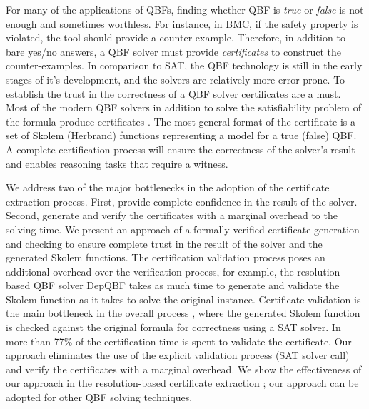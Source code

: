 \documentclass[runningheads]{llncs}
\newcommand{\0}{0}
\newcommand{\1}{1}
\begin{document}
For many of the applications of QBFs, finding whether QBF is \textit{true} or \textit{false} is not enough and sometimes worthless. For instance, in BMC, if the safety property is violated, the tool should provide a counter-example. Therefore, in addition to bare yes/no answers, a QBF solver must provide \textit{certificates} to construct the counter-examples. In comparison to SAT, the QBF technology is still in the early stages of it's development, and the solvers are relatively more error-prone. To establish the trust in the correctness of a QBF solver certificates are a must. Most of the modern QBF solvers in addition to solve the satisfiability problem of the formula produce certificates \cite{Balabanov2015, RabeS16, BalabanovJ12, Benedetti05, NarizzanoPPT09, NiemetzPLSB12, JussilaBSKW07, GoultiaevaGB11, Van2013, HeuleSB17}. The most general format of the certificate is a set of Skolem (Herbrand) functions representing a model for a true (false) QBF. 
A complete certification process will ensure the correctness of the solver's result and enables reasoning tasks that require a witness. 

We address two of the major bottlenecks in the adoption of the certificate extraction process. First, provide complete confidence in the result of the solver. Second, generate and verify the certificates with a marginal overhead to the solving time. 
We present an approach of a formally verified certificate generation and checking to ensure complete trust in the result of the solver and the generated Skolem functions. The certification validation process poses an additional overhead over the verification process, for example, the resolution based QBF solver DepQBF \cite{LonsingB10} takes as much time to generate and validate the Skolem function as it takes to solve the original instance. Certificate validation is the main bottleneck in the overall process \cite{NiemetzPLSB12}, where the generated Skolem function is checked against the original formula for correctness using a SAT solver. In \cite{NiemetzPLSB12} more than 77\% of the certification time is spent to validate the certificate. Our approach eliminates the use of the explicit validation process (SAT solver call) and verify the certificates with a marginal overhead. We show the effectiveness of our approach in the resolution-based certificate extraction \cite{NiemetzPLSB12}; our approach can be adopted for other QBF solving techniques.
\end{document}
